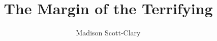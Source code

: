 \documentclass[12pt,oneside]{memoir}
\title{The Margin of the Terrifying}
\author{Madison Scott-Clary}
\begin{document}
\OnehalfSpacing

\maketitle



\printbibliography
\end{document}
